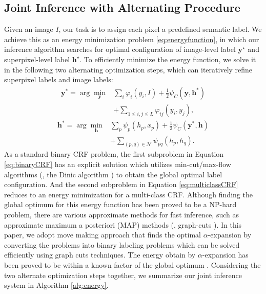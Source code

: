 \subsection{Joint Inference with Alternating Procedure}
\label{sec:inference}
Given an image $I$, our task is to assign each pixel a predefined semantic label.
We achieve this as an energy minimization problem \eqref{eq:energyfunction}, in which our inference algorithm searches for optimal configuration of image-level label $\boldsymbol{y}^\star$ and superpixel-level label $\boldsymbol{h}^\star$.
To efficiently minimize the energy function, we solve it in the following two alternating optimization steps, which can iteratively refine superpixel labels and image labels:
\begin{equation}
    \label{eq:binaryCRF}
    \begin{aligned}
        \boldsymbol{y}^* = \arg\min_{\boldsymbol{y}} &\sum_{i} {\varphi_{i}(y_i,I)} + \frac{1}{2} \psi_{C}(\boldsymbol{y},\boldsymbol{h}^*) \\ &+ \sum_{1 \le i,j \le L} {\varphi_{ij}(y_i,y_j)},
    \end{aligned}
\end{equation}
\begin{equation}
    \label{eq:multiclassCRF}
    \begin{aligned}
        \boldsymbol{h}^* = \arg\min_{\boldsymbol{h}} &\sum_{p} {\psi_{p}(h_p,x_p)} + \frac{1}{2} \psi_{C}(\boldsymbol{y}^*,\boldsymbol{h}) \\ &+ \sum_{(p,q) \in \mathcal{N}}{\psi_{pq}(h_p,h_q)}.
    \end{aligned}
\end{equation}
As a standard binary CRF problem, the first subproblem in Equation \eqref{eq:binaryCRF} has an explicit solution which utilizes min-cut/max-flow algorithms (\eg, the Dinic algorithm \cite{dinits1970algorithm}) to obtain the global optimal label configuration.
And the second subproblem in Equation \eqref{eq:multiclassCRF} reduces to an energy minimization for a multi-class CRF.
Although finding the global optimum for this energy function has been proved to be a NP-hard problem, there are various approximate methods for fast inference, such as approximate maximum a posteriori (MAP) methods (\eg, graph-cuts \cite{boykov2001fast}).
In this paper, we adopt move making approach \cite{boykov2001fast} that finds the optimal $\alpha$-expansion \cite{boykov2001fast,kolmogorov2004energy} by converting the problems into binary labeling  problems which can be solved efficiently using graph cuts techniques.
The energy obtain by $\alpha$-expansion has been proved to be within a known factor of the global optimum \cite{boykov2001fast}. Considering the two alternate optimization steps together, we summarize our joint inference system in Algorithm \ref{alg:energy}.


